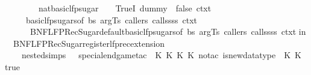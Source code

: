 \begin{isabellebody}
\ \ \ \ \ \ {\isacharparenleft}{\kern0pt}{\isacharbrackleft}{\kern0pt}{\isacharbrackright}{\kern0pt}{\isacharcomma}{\kern0pt}\ {\isacharbrackleft}{\kern0pt}{}{\isacharbrackright}{\kern0pt}{\isacharcomma}{\kern0pt}\ {\isacharbrackleft}{\kern0pt}nat{\isacharunderscore}{\kern0pt}basic{\isacharunderscore}{\kern0pt}lfp{\isacharunderscore}{\kern0pt}sugar{\isacharbrackright}{\kern0pt}{\isacharcomma}{\kern0pt}\ {\isacharbrackleft}{\kern0pt}{\isacharbrackright}{\kern0pt}{\isacharcomma}{\kern0pt}\ {\isacharbrackleft}{\kern0pt}{\isacharbrackright}{\kern0pt}{\isacharcomma}{\kern0pt}\ {\isacharbrackleft}{\kern0pt}{\isacharbrackright}{\kern0pt}{\isacharcomma}{\kern0pt}\ TrueI\ {\isacharparenleft}{\kern0pt}{\isacharasterisk}{\kern0pt}dummy{\isacharasterisk}{\kern0pt}{\isacharparenright}{\kern0pt}{\isacharcomma}{\kern0pt}\ {\isacharbrackleft}{\kern0pt}{\isacharbrackright}{\kern0pt}{\isacharcomma}{\kern0pt}\ false{\isacharcomma}{\kern0pt}\ ctxt{\isacharparenright}{\kern0pt}\isanewline
\ \ \ \ {\isacharbar}{\kern0pt}\ basic{\isacharunderscore}{\kern0pt}lfp{\isacharunderscore}{\kern0pt}sugars{\isacharunderscore}{\kern0pt}of\ bs\ arg{\isacharunderscore}{\kern0pt}Ts\ callers\ callssss\ ctxt\ {\isacharequal}{\kern0pt}\isanewline
\ \ \ \ \ \ BNF{\isacharunderscore}{\kern0pt}LFP{\isacharunderscore}{\kern0pt}Rec{\isacharunderscore}{\kern0pt}Sugar{\isachardot}{\kern0pt}default{\isacharunderscore}{\kern0pt}basic{\isacharunderscore}{\kern0pt}lfp{\isacharunderscore}{\kern0pt}sugars{\isacharunderscore}{\kern0pt}of\ bs\ arg{\isacharunderscore}{\kern0pt}Ts\ callers\ callssss\ ctxt{\isacharsemicolon}{\kern0pt}\isanewline
in\isanewline
\ \ BNF{\isacharunderscore}{\kern0pt}LFP{\isacharunderscore}{\kern0pt}Rec{\isacharunderscore}{\kern0pt}Sugar{\isachardot}{\kern0pt}register{\isacharunderscore}{\kern0pt}lfp{\isacharunderscore}{\kern0pt}rec{\isacharunderscore}{\kern0pt}extension\isanewline
\ \ \ \ {\isacharbraceleft}{\kern0pt}nested{\isacharunderscore}{\kern0pt}simps\ {\isacharequal}{\kern0pt}\ {\isacharbrackleft}{\kern0pt}{\isacharbrackright}{\kern0pt}{\isacharcomma}{\kern0pt}\ special{\isacharunderscore}{\kern0pt}endgame{\isacharunderscore}{\kern0pt}tac\ {\isacharequal}{\kern0pt}\ K\ {\isacharparenleft}{\kern0pt}K\ {\isacharparenleft}{\kern0pt}K\ {\isacharparenleft}{\kern0pt}K\ no{\isacharunderscore}{\kern0pt}tac{\isacharparenright}{\kern0pt}{\isacharparenright}{\kern0pt}{\isacharparenright}{\kern0pt}{\isacharcomma}{\kern0pt}\ is{\isacharunderscore}{\kern0pt}new{\isacharunderscore}{\kern0pt}datatype\ {\isacharequal}{\kern0pt}\ K\ {\isacharparenleft}{\kern0pt}K\ true{\isacharparenright}{\kern0pt}{\isacharcomma}{\kern0pt}\isanewline

\end{isabellebody}
